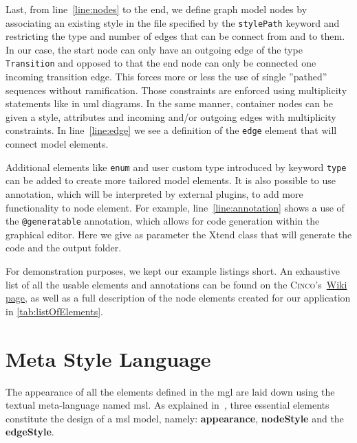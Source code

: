 Last, from line~\ref{line:nodes} to the end, we define graph model nodes by associating an existing style in the file specified by the \lstinline[language=MGL]{stylePath} keyword and restricting the type and number of edges that can be connect from and to them. In our case, the start node can only have an outgoing edge of the type \lstinline[language=MGL]{Transition} and opposed to that the end node can only be connected one incoming transition edge. This forces more or less the use of single ''pathed'' sequences without ramification. Those constraints are enforced using multiplicity statements like in \acrfull{uml} diagrams. In the same manner, container nodes can be given a style, attributes and incoming and/or outgoing edges with multiplicity constraints. In line~\ref{line:edge} we see a definition of the \lstinline[language=MGL]{edge} element that will connect model elements.

Additional elements like \lstinline[language=MGL]{enum} and user custom type introduced by keyword \lstinline[language=MGL]{type} can be added to create more tailored model elements. It is also possible to use annotation, which will be interpreted by external plugins, to add more functionality to node element. For example, line~\ref{line:annotation} shows a use of the \lstinline[language=MGL]{@generatable} annotation, which allows for code generation within the graphical editor. Here we give as parameter the Xtend class that will generate the code and the output folder.

For demonstration purposes, we kept our example listings short. An exhaustive list of all the usable elements and annotations can be found on the \textsc{Cinco}'s~\href{https://gitlab.com/scce/cinco/-/wikis/Cinco-Product-Specification}{Wiki page}, as well as a full description of the node elements created for our application in \ref{tab:listOfElements}.

\section{Meta Style Language}\label{sec:MSL}
The appearance of all the elements defined in the \acrshort{mgl} are laid down using the textual meta-language named \acrfull{msl}. As explained in~\cite{gitlabcinco}, three essential elements constitute the design of a \acrshort{msl} model, namely: \textbf{appearance}, \textbf{nodeStyle} and the \textbf{edgeStyle}.

